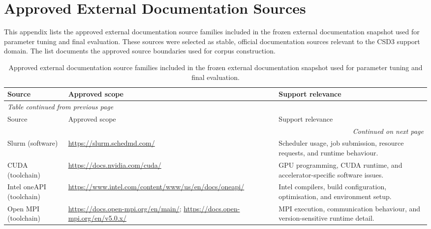 \chapter{Approved External Documentation Sources}
\label{app:external-sources}

This appendix lists the approved external documentation source families included in the frozen external documentation snapshot used for parameter tuning and final evaluation. These sources were selected as stable, official documentation sources relevant to the \ac{CSD3} support domain. The list documents the approved source boundaries used for corpus construction. 

\begingroup
\footnotesize
\setlength{\tabcolsep}{4pt}
\renewcommand{\arraystretch}{1.1}

\begin{longtable}{p{2.5cm} p{4.4cm} p{6.1cm}}
\caption{Approved external documentation source families included in the frozen external documentation snapshot used for parameter tuning and final evaluation.}
\label{tab:approved-external-sources} \\

\hline
Source & Approved scope & Support relevance \\
\hline
\endfirsthead

\multicolumn{3}{l}{\textit{Table \thetable{} continued from previous page}} \\
\hline
Source & Approved scope & Support relevance \\
\hline
\endhead

\hline
\multicolumn{3}{r}{\textit{Continued on next page}} \\
\endfoot

\hline
\endlastfoot

Slurm (software) &
\url{https://slurm.schedmd.com/} &
Scheduler usage, job submission, resource requests, and runtime behaviour. \\

CUDA (toolchain) &
\url{https://docs.nvidia.com/cuda/} &
GPU programming, CUDA runtime, and accelerator-specific software issues. \\

Intel oneAPI (toolchain) &
\url{https://www.intel.com/content/www/us/en/docs/oneapi/} &
Intel compilers, build configuration, optimisation, and environment setup. \\

Open MPI (toolchain) &
\url{https://docs.open-mpi.org/en/main/}; \url{https://docs.open-mpi.org/en/v5.0.x/} &
MPI execution, communication behaviour, and version-sensitive runtime detail. \\


\end{longtable}
